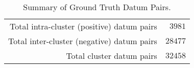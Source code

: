 \begin{table}[htp]
	\begin{center}
	\caption{Summary of Ground Truth Datum Pairs.}
	\label{tab:ch6_table_pair_summary}
		\begin{tabular}{r r}
		\toprule
			Total intra-cluster (positive) datum pairs & $3981$\\
			Total inter-cluster (negative) datum pairs & $28477$\\
			\midrule Total cluster datum pairs & $32458$\\
		\bottomrule
		\end{tabular}
	\end{center}
\end{table}